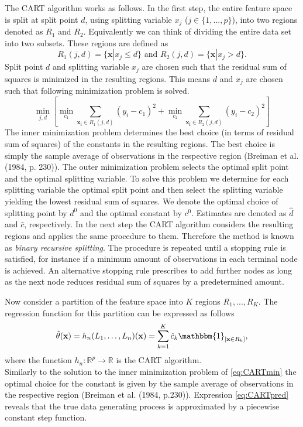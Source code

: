 \noindent
The CART algorithm works as follows. In the first step, the entire feature space is split at split point $d$, using splitting variable $x_j$ ($j \in \{1,...,p\}$), into two regions denoted as $R_1$ and $R_2$. Equivalently we can think of dividing the entire data set into two subsets. These regions are defined as
$$R_1(j,d)=\{\mathbf{x}|x_j \le d\} \text{ and } R_2(j,d)=\{\mathbf{x}|x_j > d\}.$$
\noindent
Split point $d$ and splitting variable $x_j$ are chosen such that the residual sum of squares is minimized in the resulting regions. This means $d$ and $x_j$ are chosen such that following minimization problem is solved.
\begin{equation}
\label{eq:CARTmin}
\min\limits_{j,d}[\min\limits_{c_1}\sum\limits_{\mathbf{x_i} \in R_1(j,d)}(y_i-c_1)^2 + \min\limits_{c_2}\sum\limits_{\mathbf{x_i} \in R_2(j,d)}(y_i-c_2)^2]
\end{equation}
\noindent
The inner minimization problem determines the best choice (in terms of residual sum of squares) of the constants in the resulting regions. The best choice is simply the sample average of observations in the respective region (Breiman et al. (1984, p. 230)). The outer minimization problem selects the optimal split point and the optimal splitting variable. To solve this problem we determine for each splitting variable the optimal split point and then select the splitting variable yielding the lowest residual sum of squares. We denote the optimal choice of splitting point by $d^0$ and the optimal constant by $c^0$. Estimates are denoted as $\hat{d}$ and $\hat{c}$, respectively. In the next step the CART algorithm considers the resulting regions and applies the same procedure to them. Therefore the method is known as \textit{binary recursive splitting}.  The procedure is repeated until a stopping rule is satisfied, for instance if a minimum amount of observations in each terminal node is achieved. An alternative stopping rule prescribes to add further nodes as long as the next node reduces residual sum of squares by a predetermined amount.

Now consider a partition of the feature space into $K$ regions $R_1,...,R_K$. The regression function for this partition can be expressed as follows
\begin{equation}
\label{eq:CARTpred}
\hat{\theta}(\mathbf{x})= h_{n}(L_{1},\dots, L_{n})(\mathbf{x})=\sum\limits_{k=1}^{K}\hat{c}_k\mathbbm{1}_{[\mathbf{x}\in R_k]},
\end{equation}
where the function  $h_n:\mathbb{R}^{p} \rightarrow \mathbb{R}$ is the CART algorithm.\\
Similarly to the solution to the inner minimization problem of \eqref{eq:CARTmin} the optimal choice for the constant is given by the sample average of observations in the respective region (Breiman et al. (1984, p.230)). Expression \eqref{eq:CARTpred} reveals that the true data generating process is approximated by a piecewise constant step function.

